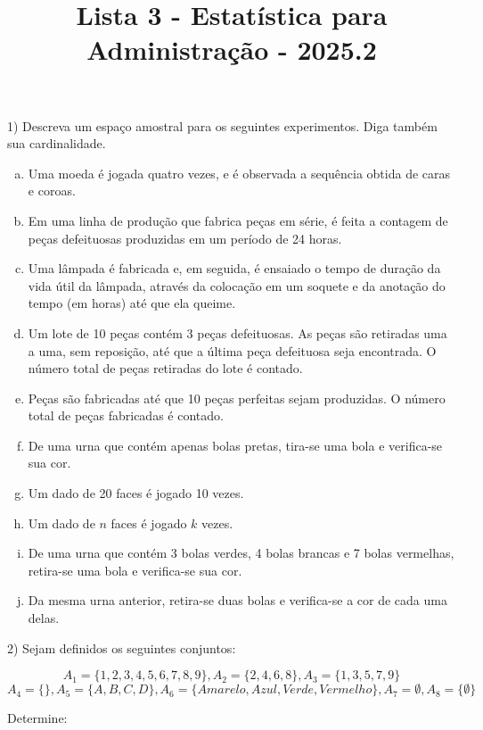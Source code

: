 \documentclass[12pt]{article}
\title{Lista 3 - Estatística para Administração - 2025.2}
\begin{document}
\date{}
\maketitle


1) Descreva um espaço amostral para os seguintes experimentos. Diga também sua cardinalidade.

\begin{enumerate}[a)]
    \item Uma moeda é jogada quatro vezes, e é observada a sequência obtida de caras e coroas.
    \item Em uma linha de produção que fabrica peças em série, é feita a contagem de peças defeituosas produzidas em um período de 24 horas.
    \item Uma lâmpada é fabricada e, em seguida, é ensaiado o tempo de duração da vida útil da lâmpada, através da colocação em um soquete e da anotação do tempo (em horas) até que ela queime.
    \item Um lote de 10 peças contém 3 peças defeituosas. As peças são retiradas uma a uma, sem reposição, até que a última peça defeituosa seja encontrada. O número total de peças retiradas do lote é contado.
    \item Peças são fabricadas até que 10 peças perfeitas sejam produzidas. O número total de peças fabricadas é contado.
    \item De uma urna que contém apenas bolas pretas, tira-se uma bola e verifica-se sua cor.
    \item Um dado de 20 faces é jogado 10 vezes.
    \item Um dado de $n$ faces é jogado $k$ vezes.
    \item De uma urna que contém 3 bolas verdes, 4 bolas brancas e 7 bolas vermelhas, retira-se uma bola e verifica-se sua cor.
    \item Da mesma urna anterior, retira-se duas bolas e verifica-se a cor de cada uma delas.
\end{enumerate}

\vspace{5px}

2) Sejam definidos os seguintes conjuntos:

$$A_1 = \{1,2,3,4,5,6,7,8,9\}, A_2 = \{2, 4, 6, 8\}, A_3 = \{1, 3, 5, 7, 9\}$$
$$A_4 = \{\}, A_5 = \{A, B, C, D\}, A_6 = \{Amarelo, Azul, Verde, Vermelho\}, A_7 = \emptyset, A_8 = \{\emptyset\}$$

Determine:
\end{document}
